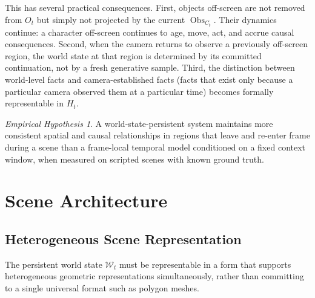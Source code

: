 \documentclass[12pt,a4paper]{article}
\theoremstyle{plain}
\theoremstyle{definition}
\theoremstyle{remark}
\newtheorem{hypothesis}[theorem]{Empirical Hypothesis}
\DeclareMathOperator{\Obs}{Obs}
\begin{document}
This has several practical consequences. First, objects off-screen are not removed from $O_t$ but simply not projected by the current $\Obs_{C_t}$. Their dynamics continue: a character off-screen continues to age, move, act, and accrue causal consequences. Second, when the camera returns to observe a previously off-screen region, the world state at that region is determined by its committed continuation, not by a fresh generative sample. Third, the distinction between world-level facts and camera-established facts (facts that exist only because a particular camera observed them at a particular time) becomes formally representable in $H_t$.

\begin{hypothesis}
\label{hyp:offscreen}
A world-state-persistent system maintains more consistent spatial and causal relationships in regions that leave and re-enter frame during a scene than a frame-local temporal model conditioned on a fixed context window, when measured on scripted scenes with known ground truth.
\end{hypothesis}

\section{Scene Architecture}
\label{sec:scene}

\subsection{Heterogeneous Scene Representation}

The persistent world state $\mathcal{W}_t$ must be representable in a form that supports heterogeneous geometric representations simultaneously, rather than committing to a single universal format such as polygon meshes.
\end{document}
